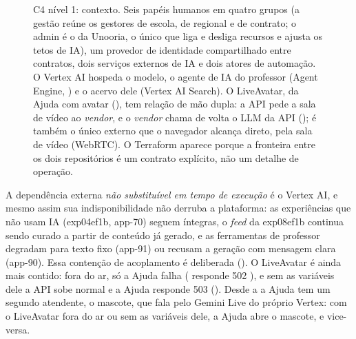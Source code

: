 \begin{figure}[H]
{}
\caption[C4 nível 1 --- contexto]{C4 nível 1: contexto. Seis papéis humanos em
  quatro grupos (a gestão reúne os gestores de escola, de regional e de
  contrato; o admin é o da Unooria, o único que liga e desliga recursos e
  ajusta os tetos de IA), um provedor de identidade compartilhado entre
  contratos, dois serviços externos de IA e dois atores de automação. O
  Vertex AI hospeda o modelo, o agente de IA do professor (Agent Engine,
  ) e o acervo dele (Vertex AI Search). O LiveAvatar, da Ajuda com
  avatar (), tem relação de mão dupla: a API pede a sala de vídeo
  ao \emph{vendor}, e o \emph{vendor} chama de volta o LLM da API
  (); é também o único externo que o navegador alcança direto,
  pela sala de vídeo (WebRTC). O Terraform aparece porque a fronteira entre os
  dois repositórios é um contrato explícito, não um detalhe de operação.}
\label{fig:c4l1}
\end{figure}

\begin{nota}
A dependência externa \emph{não substituível em tempo de execução} é o Vertex AI,
e mesmo assim sua indisponibilidade não derruba a plataforma: as experiências que
não usam IA (exp04ef1b, app-70) seguem íntegras, o \emph{feed} da exp08ef1b continua
sendo curado a partir de conteúdo já gerado, e as ferramentas de professor
degradam para texto fixo (app-91) ou recusam a geração com mensagem clara
(app-90). Essa contenção de acoplamento é deliberada ().
O LiveAvatar é ainda mais contido: fora do ar, só a Ajuda falha
( responde 502 ), e sem as variáveis
dele a API sobe normal e a Ajuda responde 503 (). Desde a
 a Ajuda tem um segundo atendente, o mascote, que fala pelo Gemini
Live do próprio Vertex: com o LiveAvatar fora do ar ou sem as variáveis dele, a
Ajuda abre o mascote, e vice-versa.
\end{nota}

